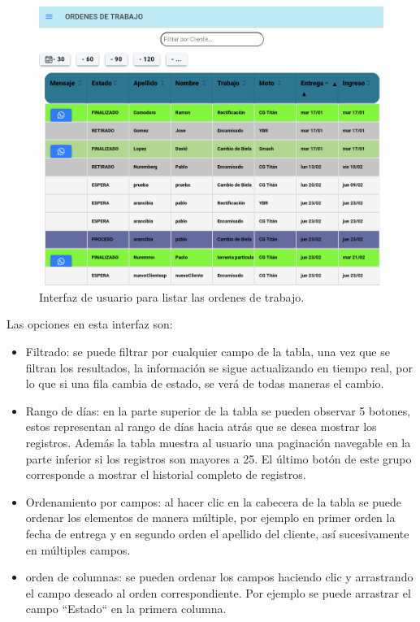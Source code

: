 \begin{figure}[H]
	\centering
	\includegraphics[scale=.40]{./Figures/listado-1.png}
	\caption{Interfaz de usuario para listar las ordenes de trabajo.}
	\label{fig:listado1}
\end{figure}

Las opciones en esta interfaz son:

\begin{itemize}
\item Filtrado: se puede filtrar por cualquier campo de la tabla, una vez que se filtran los resultados, la información se sigue actualizando en tiempo real, por lo que si una fila cambia de estado, se verá de todas maneras el cambio.

\item Rango de días: en la parte superior de la tabla se pueden observar 5 botones, estos representan al rango de días hacia atrás que se desea mostrar los registros. Además la tabla muestra al usuario una paginación navegable en la parte inferior si los registros son mayores a 25. El último botón de este grupo corresponde a mostrar el historial completo de registros.

\item Ordenamiento por campos: al hacer clic en la cabecera de la tabla se puede ordenar los elementos de manera múltiple, por ejemplo en primer orden la fecha de entrega y en segundo orden el apellido del cliente, así sucesivamente en múltiples campos.

\item orden de columnas: se pueden ordenar los campos haciendo clic y arrastrando el campo deseado al orden correspondiente. Por ejemplo se puede arrastrar el campo ``Estado`` en la primera columna.
\end{itemize}

